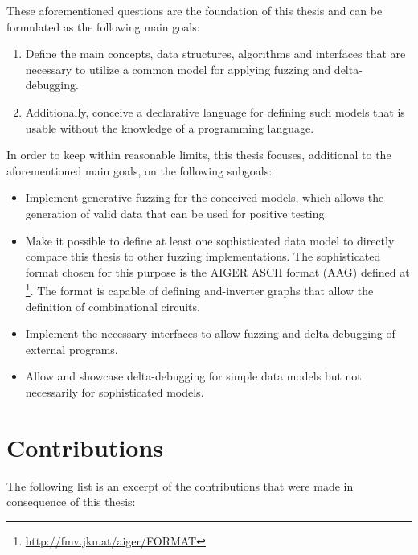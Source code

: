 These aforementioned questions are the foundation of this thesis and can be formulated as the following main goals:

\begin{enumerate}
\item Define the main concepts, data structures, algorithms and interfaces that are necessary to utilize a common model for applying fuzzing and delta-debugging.
\item Additionally, conceive a declarative language for defining such models that is usable without the knowledge of a programming language.
\end{enumerate}

In order to keep within reasonable limits, this thesis focuses, additional to the aforementioned main goals, on the following subgoals:

\begin{itemize}
\item Implement generative fuzzing for the conceived models, which allows the generation of valid data that can be used for positive testing.
\item Make it possible to define at least one sophisticated data model to directly compare this thesis to other fuzzing implementations. The sophisticated format chosen for this purpose is the AIGER ASCII format (AAG) defined at \footnote{\url{http://fmv.jku.at/aiger/FORMAT}}. The format is capable of defining and-inverter graphs that allow the definition of combinational circuits.
\item Implement the necessary interfaces to allow fuzzing and delta-debugging of external programs.
\item Allow and showcase delta-debugging for simple data models but not necessarily for sophisticated models.
\end{itemize}

\section{Contributions}
\label{sec:contributions}

The following list is an excerpt of the contributions that were made in consequence of this thesis:

